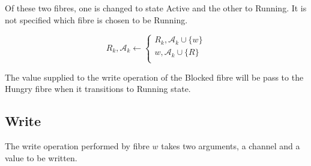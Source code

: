 \documentclass[oneside]{book}
\begin{document}
\begin{enumerate}
Of these two
fibres, one is changed to state Active and the other to Running.
It is not specified which fibre is chosen to be Running.

\begin{equation}
R_k,{\mathcal A_k} \leftarrow
\begin{cases}
R_k,{\mathcal A_k} \cup \{w\} \\
w,{\mathcal A_k} \cup \{R\} \\
\end{cases}
\end{equation}

The value supplied to the write operation of the Blocked
fibre will be pass to the Hungry fibre when it transitions
to Running state.


\end{enumerate}



\subsection{Write}
The write operation performed by fibre $w$ takes two arguments, a channel and a value
to be written.
\end{document}
